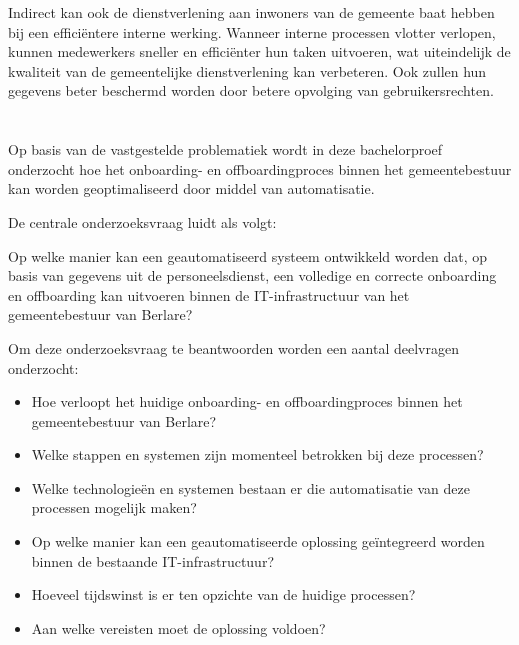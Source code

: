 Indirect kan ook de dienstverlening aan inwoners van de gemeente baat hebben bij een efficiëntere interne werking. Wanneer interne processen vlotter verlopen, kunnen medewerkers sneller en efficiënter hun taken uitvoeren, wat uiteindelijk de kwaliteit van de gemeentelijke dienstverlening kan verbeteren. Ook zullen hun gegevens beter beschermd worden door betere opvolging van gebruikersrechten.

\section{}%
\label{sec:onderzoeksvraag}


Op basis van de vastgestelde problematiek wordt in deze bachelorproef onderzocht hoe het onboarding- en offboardingproces binnen het gemeentebestuur kan worden geoptimaliseerd door middel van automatisatie. \newline

De centrale onderzoeksvraag luidt als volgt:

Op welke manier kan een geautomatiseerd systeem ontwikkeld worden dat, op basis van gegevens uit de personeelsdienst, een volledige en correcte onboarding en offboarding kan uitvoeren binnen de IT-infrastructuur van het gemeentebestuur van Berlare? \newline

Om deze onderzoeksvraag te beantwoorden worden een aantal deelvragen onderzocht:
\begin{itemize}
    \item Hoe verloopt het huidige onboarding- en offboardingproces binnen het gemeentebestuur van Berlare?
    \item Welke stappen en systemen zijn momenteel betrokken bij deze processen?
    \item Welke technologieën en systemen bestaan er die automatisatie van deze processen mogelijk maken?
    \item Op welke manier kan een geautomatiseerde oplossing geïntegreerd worden binnen de bestaande IT-infrastructuur?
    \item Hoeveel tijdswinst is er ten opzichte van de huidige processen?
    \item Aan welke vereisten moet de oplossing voldoen?
\end{itemize}
    

